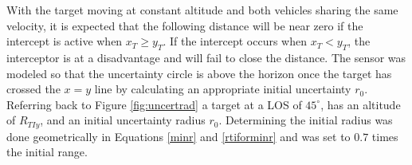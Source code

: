 \documentclass[conference]{IEEEtran}
\providecommand{\DIFdelbegin}{} %
\providecommand{\DIFdelend}{} %
\newcommand{\DIFscaledelfig}{0.5}
\newlength{\DIFdelgraphicswidth} %
\newlength{\DIFdelgraphicsheight} %
\newcommand{\DIFdelincludegraphics}[2][]{%
\sbox{\DIFdelgraphicsbox}{\DIFOincludegraphics[#1]{#2}}%
\settoboxwidth{\DIFdelgraphicswidth}{\DIFdelgraphicsbox} %
\settoboxtotalheight{\DIFdelgraphicsheight}{\DIFdelgraphicsbox} %
\scalebox{\DIFscaledelfig}{%
\parbox[b]{\DIFdelgraphicswidth}{\usebox{\DIFdelgraphicsbox}\\[-\baselineskip] \rule{\DIFdelgraphicswidth}{0em}}\llap{\resizebox{\DIFdelgraphicswidth}{\DIFdelgraphicsheight}{%
\setlength{\unitlength}{\DIFdelgraphicswidth}%
\begin{picture}(1,1)%
\thicklines\linethickness{2pt} %
{\color[rgb]{1,0,0}\put(0,0){\framebox(1,1){}}}%
{\color[rgb]{1,0,0}\put(0,0){\line( 1,1){1}}}%
{\color[rgb]{1,0,0}\put(0,1){\line(1,-1){1}}}%
\end{picture}%
}\hspace*{3pt}}} %
} %
\DeclareRobustCommand{\DIFdelbegin}{\DIFOdelbegin \let\includegraphics\DIFdelincludegraphics} %
\DeclareRobustCommand{\DIFdelend}{\DIFOaddend \let\includegraphics\DIFOincludegraphics} %
\begin{document}
\DIFdelbegin %


\DIFdelend With the target moving at constant altitude and both vehicles sharing the same velocity, it is expected that the following distance will be near zero if the intercept is active when $x_T \geq y_T$. If the intercept occurs when $x_T<y_T$, the interceptor is at a disadvantage and will fail to close the distance. The sensor was modeled so that the uncertainty circle is above the horizon once the target has crossed the $x=y$ line by calculating an appropriate initial uncertainty $r_0$. Referring back to Figure \ref{fig:uncertrad} a target at a LOS of $45^{\circ}$, has an altitude of $R_{TIy}$, and an initial uncertainty radius $r_0$. Determining the initial radius was done geometrically in Equations \ref{minr} and \ref{rtiforminr} and was set to $0.7$ times the initial range.



\DIFdelbegin %

\end{document}
